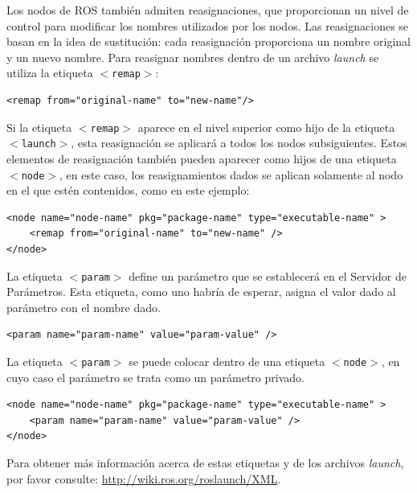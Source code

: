 \documentclass[a4paper,usenames,dvipsnames,svgnames,table]{book}
\begin{document}
Los nodos de ROS también admiten reasignaciones, que proporcionan un nivel de control para modificar los nombres utilizados por los nodos. Las reasignaciones se basan en la idea de sustitución: cada reasignación proporciona un nombre original y un nuevo nombre. Para reasignar nombres dentro de un archivo \textit{launch} se utiliza la etiqueta \texttt{$ < $remap$ > $}:

\begin{verbatim}
<remap from="original-name" to="new-name"/>
\end{verbatim}

Si la etiqueta \texttt{$ < $remap$ > $} aparece en el nivel superior como hijo de la etiqueta \texttt{$ < $launch$ > $}, esta reasignación se aplicará a todos los nodos subsiguientes. Estos elementos de reasignación también pueden aparecer como hijos de una etiqueta \texttt{$ < $node$ > $}, en este caso, los reasignamientos dados se aplican solamente al nodo en el que estén contenidos, como en este ejemplo:

\begin{verbatim}
<node name="node-name" pkg="package-name" type="executable-name" >
	<remap from="original-name" to="new-name" />
</node>
\end{verbatim}

La etiqueta \texttt{$ < $param$ > $} define un parámetro que se establecerá en el Servidor de Parámetros. Esta etiqueta, como uno habría de esperar, asigna el valor dado al parámetro con el nombre dado.

\begin{verbatim}
<param name="param-name" value="param-value" />
\end{verbatim}

La etiqueta \texttt{$ < $param$ > $} se puede colocar dentro de una etiqueta \texttt{$ < $node$ > $}, en cuyo caso el parámetro se trata como un parámetro privado.

\begin{verbatim}
<node name="node-name" pkg="package-name" type="executable-name" >
	<param name="param-name" value="param-value" />
</node>
\end{verbatim}

Para obtener más información acerca de estas etiquetas y de los archivos \textit{launch}, por favor consulte: \url{http://wiki.ros.org/roslaunch/XML}. 
\end{document}

